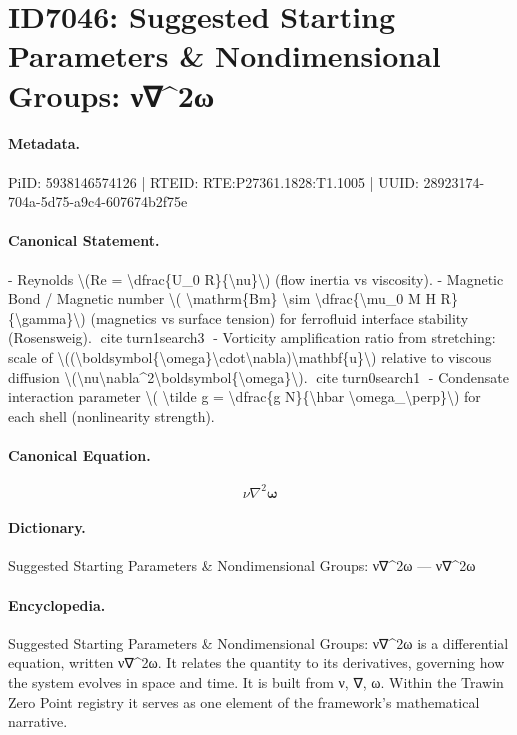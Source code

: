 \section*{ID7046: Suggested Starting Parameters \& Nondimensional Groups: ν∇\textasciicircum{}2ω}
\paragraph{Metadata.}
PiID: 5938146574126 | RTEID: RTE:P27361.1828:T1.1005 | UUID: 28923174-704a-5d75-a9c4-607674b2f75e

\paragraph{Canonical Statement.}
- Reynolds \textbackslash{}(Re = \textbackslash{}dfrac\{U\_0 R\}\{\textbackslash{}nu\}\textbackslash{}) (flow inertia vs viscosity). - Magnetic Bond / Magnetic number \textbackslash{}( \textbackslash{}mathrm\{Bm\} \textbackslash{}sim \textbackslash{}dfrac\{\textbackslash{}mu\_0 M H R\}\{\textbackslash{}gamma\}\textbackslash{}) (magnetics vs surface tension) for ferrofluid interface stability (Rosensweig). citeturn1search3 - Vorticity amplification ratio from stretching: scale of \textbackslash{}((\textbackslash{}boldsymbol\{\textbackslash{}omega\}\textbackslash{}cdot\textbackslash{}nabla)\textbackslash{}mathbf\{u\}\textbackslash{}) relative to viscous diffusion \textbackslash{}(\textbackslash{}nu\textbackslash{}nabla\textasciicircum{}2\textbackslash{}boldsymbol\{\textbackslash{}omega\}\textbackslash{}). citeturn0search1 - Condensate interaction parameter \textbackslash{}( \textbackslash{}tilde g = \textbackslash{}dfrac\{g N\}\{\textbackslash{}hbar \textbackslash{}omega\_\textbackslash{}perp\}\textbackslash{}) for each shell (nonlinearity strength).

\paragraph{Canonical Equation.}
\[
\nu\nabla^2\boldsymbol{\omega}
\]

\paragraph{Dictionary.}
Suggested Starting Parameters \& Nondimensional Groups: ν∇\textasciicircum{}2ω — ν∇\textasciicircum{}2ω

\paragraph{Encyclopedia.}
Suggested Starting Parameters \& Nondimensional Groups: ν∇\textasciicircum{}2ω is a differential equation, written ν∇\textasciicircum{}2ω. It relates the quantity to its derivatives, governing how the system evolves in space and time. It is built from ν, ∇, ω. Within the Trawin Zero Point registry it serves as one element of the framework's mathematical narrative.
